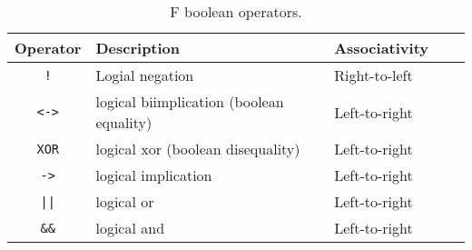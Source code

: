 \begin{table}[h]
\centering

\begin{tabular}{|c|l|l|l|l|}
\hline
\textbf{Operator} & \textbf{Description} & \textbf{Associativity} \\ 
\hline
\verb|!|	& Logial negation	& Right-to-left	\\
\verb|<->| & logical biimplication (boolean equality) & Left-to-right \\ 
\verb|XOR| & logical xor (boolean disequality) & Left-to-right \\ 
\verb|->|  & logical implication & Left-to-right \\ 
\verb!||!  & logical or & Left-to-right\\ 
\verb|&&|	& logical and & Left-to-right\\ 
\hline
\end{tabular}
\caption{F boolean operators.}
\label{table:f:bool:operators}
\end{table}



